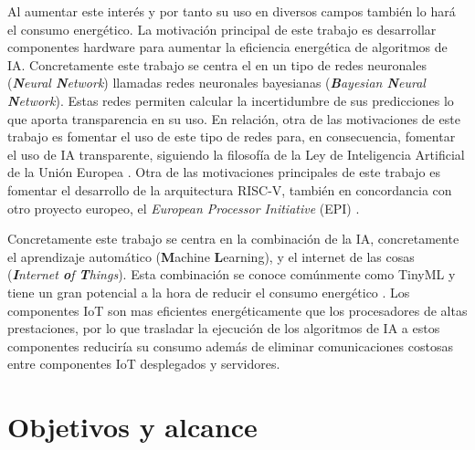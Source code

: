 Al aumentar este interés y por tanto su uso en diversos campos también lo hará el consumo energético. La motivación principal de este trabajo es desarrollar componentes hardware para aumentar la eficiencia energética de algoritmos de IA. Concretamente este trabajo se centra el en un tipo de redes neuronales (\textit{\textbf{N}eural \textbf{N}etwork}) llamadas redes neuronales bayesianas (\textit{\textbf{B}ayesian \textbf{N}eural \textbf{N}etwork}). Estas redes permiten calcular la incertidumbre de sus predicciones lo que aporta transparencia en su uso. En relación, otra de las motivaciones de este trabajo es fomentar el uso de este tipo de redes para, en consecuencia, fomentar el uso de IA transparente, siguiendo la filosofía de la Ley de Inteligencia Artificial de la Unión Europea \cite{eu_ai}. Otra de las motivaciones principales de este trabajo es fomentar el desarrollo de la arquitectura RISC-V, también en concordancia con otro proyecto europeo, el \textit{European Processor Initiative} (EPI) \cite{european_processor}.

Concretamente este trabajo se centra en la combinación de la IA, concretamente el aprendizaje automático  (\textbf{M}achine \textbf{L}earning), y el internet de las cosas (\textit{\textbf{I}nternet \textbf{o}f \textbf{T}hings}). Esta combinación se conoce comúnmente como TinyML y tiene un gran potencial a la hora de reducir el consumo energético \cite{tinyML_sustainable}. Los componentes IoT son mas eficientes energéticamente que los procesadores de altas prestaciones, por lo que trasladar la ejecución de los algoritmos de IA a estos componentes reduciría su consumo además de eliminar comunicaciones costosas entre componentes IoT desplegados y servidores.

\section{Objetivos y alcance}

